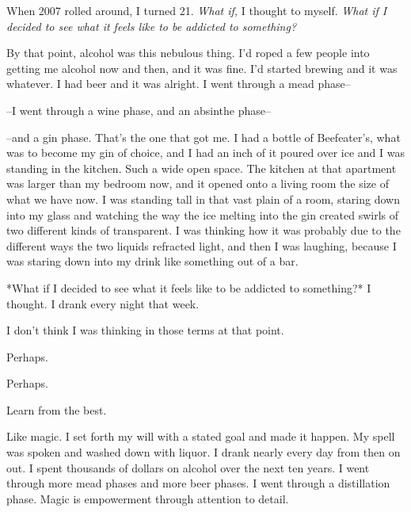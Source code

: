 When 2007 rolled around, I turned 21. \emph{What if,} I thought to myself. \emph{What if I decided to see what it feels like to be addicted to something?}

By that point, alcohol was this nebulous thing. I'd roped a few people into getting me alcohol now and then, and it was fine. I'd started brewing and it was whatever. I had beer and it was alright. I went through a mead phase--


--I went through a wine phase, and an absinthe phase--


--and a gin phase. That's the one that got me. I had a bottle of Beefeater's, what was to become my gin of choice, and I had an inch of it poured over ice and I was standing in the kitchen. Such a wide open space. The kitchen at that apartment was larger than my bedroom now, and it opened onto a living room the size of what we have now. I was standing tall in that vast plain of a room, staring down into my glass and watching the way the ice melting into the gin created swirls of two different kinds of transparent. I was thinking how it was probably due to the different ways the two liquids refracted light, and then I was laughing, because I was staring down into my drink like something out of a bar.

*What if I decided to see what it feels like to be addicted to something?* I thought. I drank every night that week.


I don't think I was thinking in those terms at that point.


Perhaps.


Perhaps.


Learn from the best.


Like magic. I set forth my will with a stated goal and made it happen. My spell was spoken and washed down with liquor. I drank nearly every day from then on out. I spent thousands of dollars on alcohol over the next ten years. I went through more mead phases and more beer phases. I went through a distillation phase. Magic is empowerment through attention to detail.

